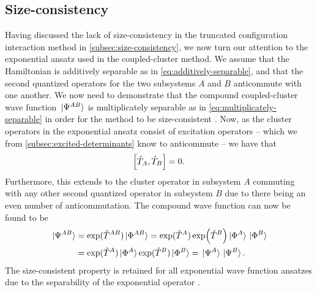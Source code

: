         \subsection{Size-consistency}
            Having discussed the lack of size-consistency in the truncated
            configuration interaction method in
            \autoref{subsec:size-consistency}, we now turn our attention to the
            exponential ansatz used in the coupled-cluster method.
            We assume that the Hamiltonian is additively separable as in
            \autoref{eq:additively-separable}, and that the second quantized
            operators for the two subsystems $A$ and $B$ anticommute with one
            another.
            We now need to demonstrate that the compound coupled-cluster wave
            function $\ket*{\Psi^{AB}}$ is multiplicately separable as in
            \autoref{eq:multiplicately-separable} in order for the method to be
            size-consistent \cite{helgaker-molecular}.
            Now, as the cluster operators in the exponential ansatz consist of
            excitation operators -- which we from
            \autoref{subsec:excited-determinants} know to anticommute -- we have
            that
            \begin{align}
                \left[\hat{T}_{A}, \hat{T}_{B}\right] = 0.
            \end{align}
            Furthermore, this extends to the cluster operator in subsystem $A$
            commuting with any other second quantized operator in subsystem $B$
            due to there being an even number of anticommutation.
            The compound wave function can now be found to be
            \begin{align}
                \ket*{\Psi^{AB}}
                &= \exponential(\clust^{AB})\ket*{\slat^{AB}}
                =
                \exponential(\clust^{A})\exp(\clust^{B})
                \ket*{\slat^{A}}\ket*{\slat^{B}}
                \\
                &=
                \exponential(\clust^{A})\ket*{\slat^{A}}
                \exponential(\clust^{B})\ket*{\slat^{B}}
                = \ket*{\Psi^{A}}\ket*{\Psi^{B}}.
            \end{align}
            The size-consistent property is retained for all exponential wave
            function ansatzes due to the separability of the exponential
            operator \cite{helgaker-molecular, size-extensivity}.

